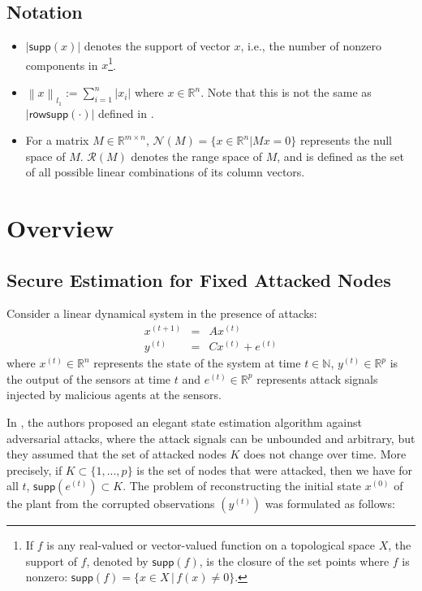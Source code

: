 \documentclass[journal]{IEEEtran}
\newcommand{\norm}[1]{\left\lVert#1\right\rVert}
\begin{document}
\subsection{Notation}
\begin{itemize}
\item 
$\lvert \textsf{supp} (x) \rvert $  denotes the support of vector $x$, i.e., the number of nonzero components in $x$\footnote{If $f$ is any real-valued or vector-valued function on a topological space $X$, the support of $f$, denoted by $\textsf{supp}(f)$, is the closure of the set points where $f$ is nonzero: $\textsf{supp}(f)  = \{ x \in X \,|\, f(x) \neq 0 \}$.}. 
\item 
$\norm{ x}_{l_1}:= \sum_{i=1} ^n \lvert x_i \rvert $ where $x \in \mathbb{R}^n$. Note that this is not the same as $\lvert \textsf{rowsupp} ( \cdot )  \rvert $ defined in \cite{Fawzi2014}. 
\item  
For a matrix $M \in \mathbb{R}^{m \times n}$, $\mathcal{N} (M) = \{ x \in \mathbb{R}^n \lvert M x = 0 \}$ represents the null space of $M$. $\mathcal{R}(M)$ denotes the range space of $M$, and is defined as the set of all possible linear combinations of its column vectors.
\end{itemize}









\section{Overview}\label{sec:overview}
\subsection{Secure Estimation for Fixed Attacked Nodes \cite{Fawzi2014} }Consider a linear dynamical system in the presence of attacks:
\begin{eqnarray}
		x^{(t+1)} &=& A x^{(t)}  \nonumber \\
		y^{(t)} &=& C x ^{(t)} + e^{(t)}
		\label{eq:system_model}
\end{eqnarray}
where $x^{(t)}\in \mathbb{R}^n$ represents the state of the system at time $t\in \mathbb{N}$, $y^{(t)} \in \mathbb{R}^p$ is the output of the sensors at time $t$ and $e^{(t)} \in \mathbb{R}^p $ represents attack signals injected by malicious agents at the sensors. 

In \cite{Fawzi2014}, the authors proposed an elegant state estimation algorithm against adversarial attacks, where the attack signals can be unbounded and arbitrary, but they assumed that the set of attacked nodes $K$ does not change over time. More precisely, if $K \subset \{1, ..., p\}$ is the set of nodes that were attacked, then we have for all $t$, $\textsf{supp}(e^{(t)})\subset K$. The problem of reconstructing the initial state $x^{(0)}$ of the plant from the corrupted observations $( y^{(t)})$ was formulated as follows:
\end{document}
